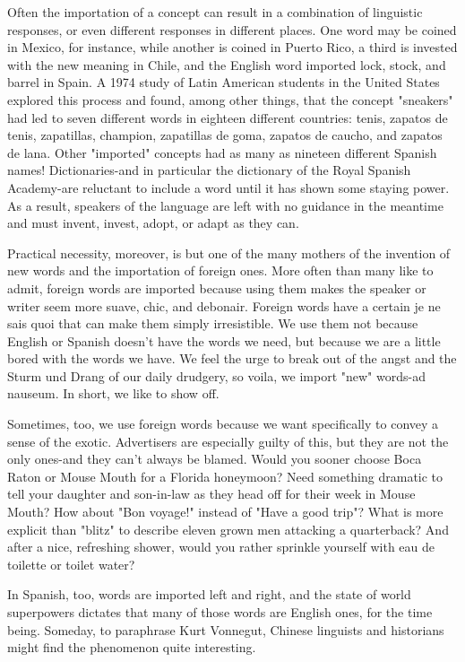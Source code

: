 Often the importation of a concept can result in a combination
of linguistic responses, or even different responses in different places.
One word may be coined in Mexico, for instance, while another is
coined in Puerto Rico, a third is invested with the new meaning in
Chile, and the English word imported lock, stock, and barrel in Spain.
A 1974 study of Latin American students in the United States explored
this process and found, among other things, that the concept "sneakers" had led to seven different words in eighteen different countries:
tenis, zapatos de tenis, zapatillas, champion, zapatillas de goma, zapatos de caucho, and zapatos de lana. Other "imported" concepts had
as many as nineteen different Spanish names! Dictionaries-and in
particular the dictionary of the Royal Spanish Academy-are reluctant
to include a word until it has shown some staying power. As a result,
speakers of the language are left with no guidance in the meantime and
must invent, invest, adopt, or adapt as they can.

Practical necessity, moreover, is but one of the many mothers
of the invention of new words and the importation of foreign ones.
More often than many like to admit, foreign words are imported because using them makes the speaker or writer seem more suave, chic,
and debonair. Foreign words have a certain je ne sais quoi that can
make them simply irresistible. We use them not because English or
Spanish doesn't have the words we need, but because we are a little
bored with the words we have. We feel the urge to break out of the
angst and the Sturm und Drang of our daily drudgery, so voila, we import "new" words-ad nauseum. In short, we like to show off.

Sometimes, too, we use foreign words because we want specifically to convey a sense of the exotic. Advertisers are especially
guilty of this, but they are not the only ones-and they can't always
be blamed. Would you sooner choose Boca Raton or Mouse Mouth for
a Florida honeymoon? Need something dramatic to tell your daughter
and son-in-law as they head off for their week in Mouse Mouth? How
about "Bon voyage!" instead of "Have a good trip"? What is more explicit than "blitz" to describe eleven grown men attacking a quarterback? And after a nice, refreshing shower, would you rather sprinkle
yourself with eau de toilette or toilet water?

In Spanish, too, words are imported left and right, and the
state of world superpowers dictates that many of those words are English ones, for the time being. Someday, to paraphrase Kurt Vonnegut,
Chinese linguists and historians might find the phenomenon quite
interesting.

